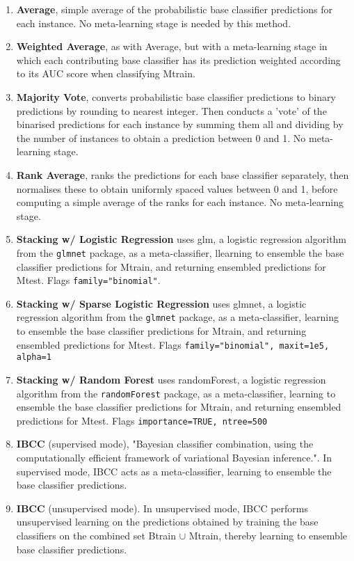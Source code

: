 \documentclass{bioinfo}
\begin{document}
\begin{methods}
\begin{enumerate}
    \item \textbf{Average}, simple average of the probabilistic base classifier predictions for each instance. No meta-learning stage is needed by this method.
    \item \textbf{Weighted Average}, as with Average, but with a meta-learning stage in which each contributing base classifier has its prediction weighted according to its AUC score when classifying Mtrain.
    \item \textbf{Majority Vote}, converts probabilistic base classifier predictions to binary predictions by rounding to nearest integer. Then conducts a 'vote' of the binarised predictions for each instance by summing them all and dividing by the number of instances to obtain a prediction between 0 and 1. No meta-learning stage.
    \item \textbf{Rank Average}, ranks the predictions for each base classifier separately, then normalises these to obtain uniformly spaced values between 0 and 1, before computing a simple average of the ranks for each instance. No meta-learning stage.
    \item \textbf{Stacking w/ Logistic Regression} uses glm, a logistic regression algorithm from the \texttt{glmnet} package, as a meta-classifier, llearning to ensemble the base classifier predictions for Mtrain, and returning ensembled predictions for Mtest. Flags \texttt{family="binomial"}.
    \item \textbf{Stacking w/ Sparse Logistic Regression} uses glmnet, a logistic regression algorithm from the \texttt{glmnet} package, as a meta-classifier, learning to ensemble the base classifier predictions for Mtrain, and returning ensembled predictions for Mtest. Flags \texttt{family="binomial", maxit=1e5, alpha=1}
    \item \textbf{Stacking w/ Random Forest} uses randomForest, a logistic regression algorithm from the \texttt{randomForest} package, as a meta-classifier, learning to ensemble the base classifier predictions for Mtrain, and returning ensembled predictions for Mtest. Flags \texttt{importance=TRUE, ntree=500}
    \item \textbf{IBCC} (supervised mode), "Bayesian classifier combination, using the computationally efficient framework of variational Bayesian inference."\cite{Simpson13}. In supervised mode, IBCC acts as a meta-classifier, learning to ensemble the base classifier predictions.
    \item \textbf{IBCC} (unsupervised mode). In unsupervised mode, IBCC performs unsupervised learning on the predictions obtained by training the base classifiers on the combined set Btrain $\cup$ Mtrain, thereby learning to ensemble base classifier predictions.
\end{enumerate}


\end{methods}
\end{document}
